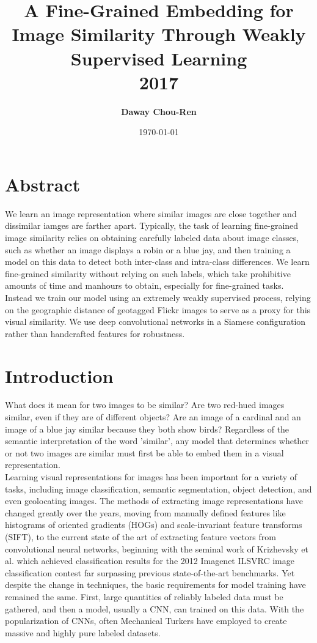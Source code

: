 \documentclass[pageno]{jpaper}
\title{\bf A Fine-Grained Embedding for Image Similarity Through Weakly Supervised Learning\\[2ex] 
       \rm\normalsize 2017}
\date{\today}
\author{\bf Daway Chou-Ren}
\begin{document}
\maketitle

\thispagestyle{empty}
\doublespacing

\section{Abstract}
We learn an image representation where similar images are close together and dissimilar iamges are farther apart. Typically, the task of learning fine-grained image similarity relies on obtaining carefully labeled data about image classes, such as whether an image displays a robin or a blue jay, and then training a model on this data to detect both inter-class and intra-class differences. We learn fine-grained similarity without relying on such labels, which take prohibitive amounts of time and manhours to obtain, especially for fine-grained tasks. Instead we train our model using an extremely weakly supervised process, relying on the geographic distance of geotagged Flickr images to serve as a proxy for this visual similarity. We use deep convolutional networks in a Siamese configuration rather than handcrafted features for robustness. 

\section{Introduction}
What does it mean for two images to be similar? Are two red-hued images similar, even if they are of different objects? Are an image of a cardinal and an image of a blue jay similar because they both show birds? Regardless of the semantic interpretation of the word 'similar', any model that determines whether or not two images are similar must first be able to embed them in a visual representation.\\

Learning visual representations for images has been important for a variety of tasks, including image classification, semantic segmentation, object detection, and even geolocating images. The methods of extracting image representations have changed greatly over the years, moving from manually defined features like histograms of oriented gradients (HOGs) and scale-invariant feature transforms (SIFT)\cite{lowe1999object}\cite{dalal2005histograms}, to the current state of the art of extracting feature vectors from convolutional neural networks, beginning with the seminal work of Krizhevsky et al. which achieved classification results for the 2012 Imagenet ILSVRC image classification contest far surpassing previous state-of-the-art benchmarks\cite{krizhevsky2012imagenet}. Yet despite the change in techniques, the basic requirements for model training have remained the same. First, large quantities of reliably labeled data must be gathered, and then a model, usually a CNN, can trained on this data. With the popularization of CNNs, often Mechanical Turkers have employed to create massive and highly pure labeled datasets.\\
\end{document}

